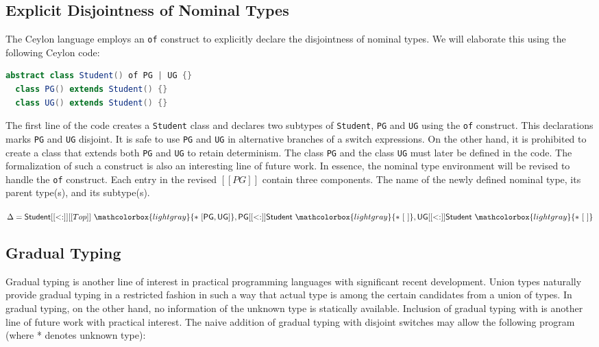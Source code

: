 \subsection{Explicit Disjointness of Nominal Types}
The Ceylon language employs an \lstinline{of}
construct to explicitly declare the disjointness
of nominal types. We will elaborate this using the
following Ceylon code:

\begin{lstlisting}[language=Scala]
  abstract class Student() of PG | UG {}
  class PG() extends Student() {}
  class UG() extends Student() {}
\end{lstlisting}

\noindent The first line of the code creates a \lstinline{Student}
class and declares two subtypes of \lstinline{Student}, \lstinline{PG} 
and \lstinline{UG} using the \lstinline{of} construct.
This declarations marks \lstinline{PG} and \lstinline{UG} disjoint.
It is safe to use \lstinline{PG} and \lstinline{UG} in alternative
branches of a switch expressions. On the other hand, it is
prohibited to create a class that extends both \lstinline{PG} and
\lstinline{UG} to retain determinism. The class \lstinline{PG}
and the class \lstinline{UG} must later be defined in the code.
The formalization of such a construct is also an interesting line of
future work. In essence, the nominal type environment will be
revised to handle the \lstinline{of} construct. Each entry
in the revised $[[PG]]$ contain three components. The name of the
newly defined nominal type, its parent type(s), and its subtype(s).

\begin{center}
$\Delta = \mathsf{Student} [[<:]] [[Top]] ~ \mathcolorbox{lightgray}{* ~ \mathsf{[PG,UG]}},
\mathsf{PG} [[<:]] \mathsf{Student} ~ \mathcolorbox{lightgray}{* ~ \mathsf{[~]}},
\mathsf{UG} [[<:]] \mathsf{Student} ~ \mathcolorbox{lightgray}{* ~ \mathsf{[~]}}$
\end{center}

\subsection{Gradual Typing}

Gradual typing is another line of
interest in practical programming
languages with significant recent development.
Union types naturally provide
gradual typing in a restricted fashion
in such a way that actual type is among
the certain candidates from a union of types.
In gradual typing, on the other hand, no
information of the unknown type is statically available.
Inclusion of gradual typing with \name is another
line of future work with practical interest.
The naive addition of
gradual typing with disjoint switches may allow the following program
(where * denotes unknown type):

